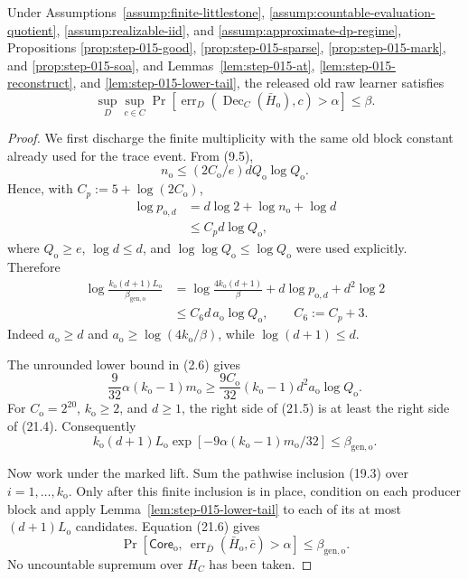 \begin{proposition}\label{prop:step-015-pac}
Under Assumptions~\ref{assump:finite-littlestone},
\ref{assump:countable-evaluation-quotient},
\ref{assump:realizable-iid}, and
\ref{assump:approximate-dp-regime}, Propositions
\ref{prop:step-015-good}, \ref{prop:step-015-sparse},
\ref{prop:step-015-mark}, and \ref{prop:step-015-soa}, and
Lemmas~\ref{lem:step-015-at}, \ref{lem:step-015-reconstruct}, and
\ref{lem:step-015-lower-tail}, the released old raw learner satisfies
\[
\sup_D\sup_{c\in C}
\Pr[
\operatorname{err}_D(\operatorname{Dec}_C(\bar H_{\mathrm o}),c)
>\alpha]
\le\beta.
\tag{21.1}
\]


\end{proposition}

\begin{proof}
We first discharge the finite multiplicity with the same old block
constant already used for the trace event. From (9.5),
\[
n_{\mathrm o}\le(2C_{\mathrm o}/e)dQ_{\mathrm o}\log Q_{\mathrm o}.
\tag{21.2}
\]
Hence, with
\(C_p:=5+\log(2C_{\mathrm o})\),
\[
\begin{aligned}
\log p_{\mathrm o,d}
&=d\log2+\log n_{\mathrm o}+\log d\\
&\le C_p d\log Q_{\mathrm o},
\end{aligned}
\tag{21.3}
\]
where \(Q_{\mathrm o}\ge e\), \(\log d\le d\), and
\(\log\log Q_{\mathrm o}\le\log Q_{\mathrm o}\) were used explicitly.
Therefore
\[
\begin{aligned}
\log\frac{k_{\mathrm o}(d+1)L_{\mathrm o}}
{\beta_{\mathrm{gen,o}}}
&=\log\frac{4k_{\mathrm o}(d+1)}\beta
+d\log p_{\mathrm o,d}+d^2\log2\\
&\le C_6d\,a_{\mathrm o}\log Q_{\mathrm o},
\qquad C_6:=C_p+3.
\end{aligned}
\tag{21.4}
\]
Indeed \(a_{\mathrm o}\ge d\) and
\(a_{\mathrm o}\ge\log(4k_{\mathrm o}/\beta)\), while
\(\log(d+1)\le d\).

The unrounded lower bound in (2.6) gives
\[
\frac9{32}\alpha(k_{\mathrm o}-1)m_{\mathrm o}
\ge\frac{9C_{\mathrm o}}{32}
(k_{\mathrm o}-1)d^2a_{\mathrm o}\log Q_{\mathrm o}.
\tag{21.5}
\]
For \(C_{\mathrm o}=2^{20}\), \(k_{\mathrm o}\ge2\), and \(d\ge1\),
the right side of (21.5) is at least the right side of (21.4).
Consequently
\[
k_{\mathrm o}(d+1)L_{\mathrm o}
\exp[-9\alpha(k_{\mathrm o}-1)m_{\mathrm o}/32]
\le\beta_{\mathrm{gen,o}}.
\tag{21.6}
\]

Now work under the marked lift. Sum the pathwise inclusion (19.3) over
\(i=1,\ldots,k_{\mathrm o}\). Only after this finite inclusion is in
place, condition on each producer block and apply
Lemma~\ref{lem:step-015-lower-tail} to each of its at most
\((d+1)L_{\mathrm o}\) candidates. Equation (21.6) gives
\[
\Pr[
\mathsf{Core}_{\mathrm o},\
\operatorname{err}_{\bar D}(\bar H_{\mathrm o},\bar c)>\alpha]
\le\beta_{\mathrm{gen,o}}.
\tag{21.7}
\]
No uncountable supremum over \(H_C\) has been taken.


\end{proof}

